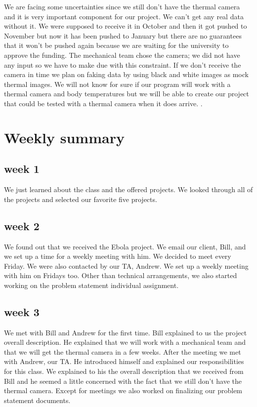 \documentclass[onecolumn, draftclsnofoot,10pt, compsoc]{IEEEtran}
\begin{document}
We are facing some uncertainties since we still don’t have the thermal camera and it is very important component for our project. We can’t get any real data without it. We were supposed to receive it in October and then it got pushed to November but now it has been pushed to January but there are no guarantees that it won’t be pushed again because we are waiting for the university to approve the funding. The mechanical team chose the camera; we did not have any input so we have to make due with this constraint. If we don’t receive the camera in time we plan on faking data by using black and white images as mock thermal images. We will not know for sure if our program will work with a thermal camera and body temperatures but we will be able to create our project that could be tested with a thermal camera when it does arrive. .

\section{Weekly summary}
\subsection{week 1}
We just learned about the class and the offered projects. We looked through all of the projects and selected our favorite five projects.

\subsection{week 2}
We found out that we received the Ebola project. We email our client, Bill, and we set up a time for a weekly meeting with him. We decided to meet every Friday. We were also contacted by our TA, Andrew. We set up a weekly meeting with him on Fridays too. Other than technical arrangements, we also started working on the problem statement individual assignment. 

\subsection{week 3}
We met with Bill and Andrew for the first time. Bill explained to us the project overall description. He explained that we will work with a mechanical team and that we will get the thermal camera in a few weeks. After the meeting we met with Andrew, our TA. He introduced himself and explained our responsibilities for this class. We explained to his the overall description that we received from Bill and he seemed a little concerned with the fact that we still don’t have the thermal camera. Except for meetings we also worked on finalizing our problem statement documents. 
\end{document}
